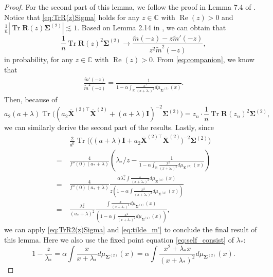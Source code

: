 \documentclass[twoside,11pt]{article}
\newcommand{\R}{\mathbb{R}}
\def\bI{{\mathbf I}}
\def\bR{{\boldsymbol R}}
\def\bX{{\boldsymbol X}}
\def\bSigma{{\boldsymbol \Sigma}}
\newcommand{\Tr}{\operatorname{Tr}}
\newcommand{\1}{\mathbf{1}}
\renewcommand{\Re}{\operatorname{Re}}
\begin{document}
\begin{proof}
For the second part of this lemma, we follow the proof in Lemma 7.4 of
\citep{dobriban2018high}. Notice that \eqref{eq:TrR(z)Sigma} holds for any $z\in \mathbb{C}$ with $\Re(z)>0$ and $\frac{1}{n}|\Tr\bR(z)\bSigma^{(2)}|\lesssim 1$. Based on Lemma 2.14 in \citep{bai2010spectral}, we can obtain that \begin{equation}\label{eq:TrR2(z)Sigma}
    \frac{1}{n}\Tr\bR(z)^2\bSigma^{(2)}\to \frac{\widetilde m(-z)-z\widetilde m'(-z)}{z^2\widetilde m^2(-z)},
\end{equation}
in probability, for any $z\in \mathbb{C}$ with $\Re(z)>0$. From \eqref{eq:companion}, we know that 
\begin{align}\label{eq:tilde_m'}
    \frac{\widetilde m'(-z)}{\widetilde m^2(-z)}= \frac{1}{1-\alpha \int_{\R}\frac{x^2}{(x+\lambda_*)^2}d\mu_{\bSigma^{(2)}}(x)}.
\end{align}
Then, because of 
\[a_2(a+\lambda)\Tr\big((a_2\overline{\bX}^{(2)\top}\overline{\bX}^{(2)}+(a+\lambda)\bI)^{-2}\bSigma^{(2)}\big)= z_n\cdot \frac{1}{n}\Tr\bR(z_n)^2\bSigma^{(2)}, \] 
we can similarly derive the second part of the results. Lastly, since
\begin{align}
     &\frac{2}{d^2}\Tr\big(\big((a +\lambda)\bI+a_2\overline\bX^{(2)\top}\overline\bX^{(2)}\big)^{-2}\bSigma^{(2)}\big)\\ = ~&
       \frac{4 }{f''(0)(a_*+\lambda)} \left(\lambda_*/z-\frac{1}{1-\alpha \int_{\R}\frac{x^2}{(x+\lambda_*)^2}d\mu_{\bSigma^{(2)}}(x)}\right)\\
       =~&\frac{4 }{f''(0)(a_*+\lambda)} \frac{ \alpha\lambda_*^2\int \frac{  x}{(x+\lambda_*)^2}d\mu_{\bSigma^{(2)}}(x) }{ z(1-  \alpha\int \frac{x^2 }{(x+\lambda_*)^2}d\mu_{\bSigma^{(2)}}(x))}\\  = ~&\frac{\lambda_*^2 }{ (a_*+\lambda)^2} \frac{  \int \frac{  x}{(x+\lambda_*)^2}d\mu_{\bSigma^{(2)}}(x) }{  (1-  \alpha\int \frac{x^2 }{(x+\lambda_*)^2}d\mu_{\bSigma^{(2)}}(x))},
\end{align}we can apply \eqref{eq:TrR2(z)Sigma} and \eqref{eq:tilde_m'}  to conclude the final result of this lemma.
Here we also use the fixed point equation \eqref{eq:self_consist} of $\lambda_*$:
\begin{equation} 
   1- \frac{z }{\lambda_*} = \alpha\int \frac{x}{x+\lambda_*}d\mu_{\bSigma^{(2)}}(x) =\alpha\int \frac{x^2+\lambda_* x}{(x+\lambda_*)^2}d\mu_{\bSigma^{(2)}}(x).
\end{equation}
\end{proof}


\end{document}
